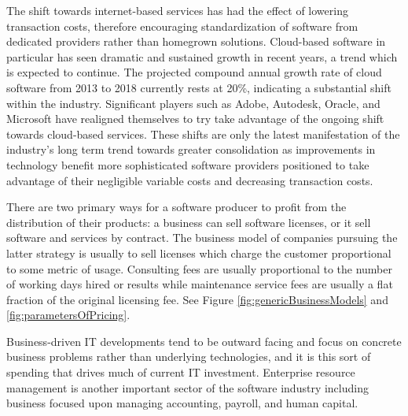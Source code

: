 The shift towards internet-based services has had the effect of lowering transaction costs, therefore encouraging standardization of software from dedicated providers rather than homegrown solutions.\autocite[46]{buxmann2012software}\autocite[]{SurveysSoftware2015}
Cloud-based software in particular has seen dramatic and sustained growth in recent years, a trend which is expected to continue.
The projected compound annual growth rate of cloud software from 2013 to 2018 currently rests at 20\%, indicating a substantial shift within the industry. Significant players such as Adobe, Autodesk, Oracle, and Microsoft have realigned themselves to try take advantage of the ongoing shift towards cloud-based services.\autocite[40]{SurveysSoftware2015}
These shifts are only the latest manifestation of the industry's long term trend towards greater consolidation as improvements in technology benefit more sophisticated software providers positioned to take advantage of their negligible variable costs and decreasing transaction costs.\autocite[14]{buxmann2012software}

There are two primary ways for a software producer to profit from the distribution of their products: a business can sell software licenses, or it sell software and services by contract.\autocite[]{ValuelineOverview}
The business model of companies pursuing the latter strategy is usually to sell licenses which charge the customer proportional to some metric of usage.\autocite[14]{buxmann2012software}
Consulting fees are usually proportional to the number of working days hired or results while maintenance service fees are usually a flat fraction of the original licensing fee.\autocite[16]{buxmann2012software} See Figure \ref{fig:genericBusinessModels} and \ref{fig:parametersOfPricing}.

Business-driven IT developments tend to be outward facing and focus on concrete business problems rather than underlying technologies, and it is this sort of spending that drives much of current IT investment.\autocite[]{NextGenBusinessSoftware}
Enterprise resource management is another important sector of the software industry including business focused upon managing accounting, payroll, and human capital.\autocite[46]{SurveysSoftware2015}


